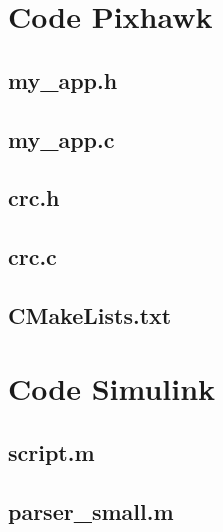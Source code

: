 \section{Code Pixhawk}

\subsection*{my\_app.h}

%

\subsection*{my\_app.c}


\subsection*{crc.h}


\subsection*{crc.c}


\subsection*{CMakeLists.txt}




\section{Code Simulink}

\subsection*{script.m}


\subsection*{parser\_small.m}



\clearpage